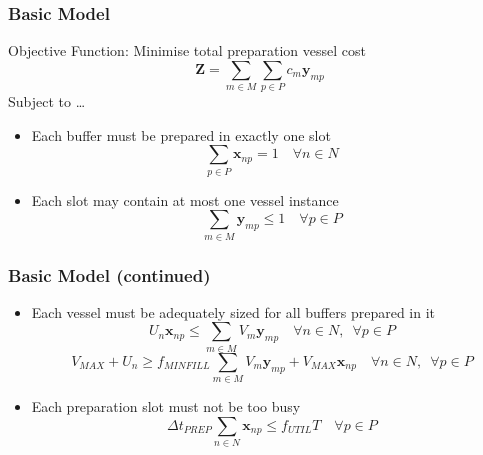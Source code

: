 \documentclass{beamer}
\begin{document}
\begin{frame}
    \frametitle{Basic Model}
    Objective Function: Minimise total preparation vessel cost\\
    \begin{equation}
        \boldsymbol{Z} = \sum_{m \in M} \sum_{p \in P} c_m \boldsymbol{y}_{mp}
    \end{equation}
    Subject to \ldots
    \begin{itemize}
    \item Each buffer must be prepared in exactly one slot\\
    \begin{equation}
        \sum_{p \in P} \boldsymbol{x}_{np} = 1 \quad \forall n \in N
    \end{equation}
    \item Each slot may contain at most one vessel instance
    \begin{equation}
        \sum_{m \in M} \boldsymbol{y}_{mp} \le 1 \quad \forall p \in P
    \end{equation}
    \end{itemize}
\end{frame}

\begin{frame}
    \frametitle{Basic Model (continued)}
    \begin{itemize}
    \item Each vessel must be adequately sized for all buffers prepared in it
    \begin{equation}
        U_{n} \boldsymbol{x}_{np} \le \sum_{m \in M} V_{m} \boldsymbol{y}_{mp}
        \quad \forall n \in N, \enspace \forall p \in P
    \end{equation}
    \begin{equation}
        V_{\mathit{MAX}} + U_{n} \ge 
        f_{\mathit{MINFILL}} \sum_{m \in M} V_{m} \boldsymbol{y}_{mp}
        + V_{\mathit{MAX}} \boldsymbol{x}_{np} 
        \quad \forall n \in N, \enspace \forall p \in P
    \end{equation}
    \item Each preparation slot must not be too busy
    \begin{equation}
        \Delta t_{\mathit{PREP}} \sum_{n \in N} \boldsymbol{x}_{np} \le
        f_{\mathit{UTIL}} T \quad \forall p \in P
    \end{equation}
    \end{itemize}
\end{frame}
\end{document}
